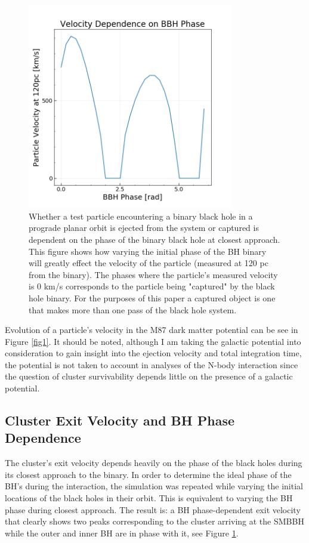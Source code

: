 \documentclass{aastex62}
\begin{document}
\begin{figure}
\includegraphics[width=9cm,height=9cm]{./Images/phase_loop.png}
\centering
\caption{Whether a test particle encountering a binary black hole in a prograde planar orbit is ejected from the system or captured is dependent on the phase of the binary black hole at closest approach. This figure shows how varying the initial phase of the BH binary will greatly effect the velocity of the particle (measured at 120 pc from the binary). The phases where the particle's measured velocity is 0 km/s corresponds to the particle being "captured" by the black hole binary. For the purposes of this paper a captured object is one that makes more than one pass of the black hole system.   \label{fig2}}
\end{figure}

Evolution of a particle's velocity in the M87 dark matter potential can be see in Figure \ref{fig1}. It should be noted, although I am taking the galactic potential into consideration to gain insight into the ejection velocity and total integration time, the potential is not taken to account in analyses of the N-body interaction since the question of cluster survivability depends little on the presence of a galactic potential. 
\subsection{Cluster Exit Velocity and BH Phase Dependence}
The cluster's exit velocity depends heavily on the phase of the black holes during its closest approach to the binary. In order to determine the ideal phase of the BH's during the interaction, the simulation was repeated while varying the initial locations of the black holes in their orbit. This is equivalent to varying the BH phase during closest approach. The result is: a BH phase-dependent exit velocity that clearly shows two peaks corresponding to the cluster arriving at the SMBBH while the outer and inner BH are in phase with it, see Figure \ref{fig2}.
\end{document}
